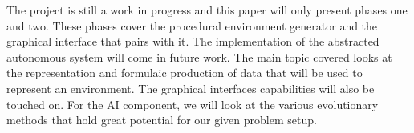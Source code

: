 The project is still a work in progress and this paper will only present phases one and two.
These phases cover the procedural environment generator and the graphical interface that pairs with it.
The implementation of the abstracted autonomous system will come in future work.
The main topic covered looks at the representation and formulaic production of data that will be used to represent an environment.
The graphical interfaces capabilities will also be touched on.
For the AI component, we will look at the various evolutionary methods that hold great potential for our given problem setup.
